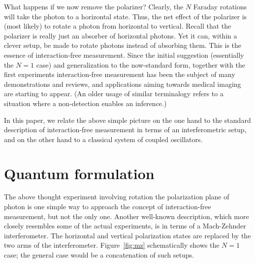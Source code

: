 \documentclass[12pt,aps,prb,preprint]{revtex4}
\begin{document}
What happens if we now remove the polarizer?  Clearly, the $N$ Faraday
rotations will take the photon to a horizontal state.  Thus, the net
effect of the polarizer is (most likely) to rotate a photon from
horizontal to vertical.  Recall that the polarizer is really just an
absorber of horizontal photons.  Yet it can, within a clever setup, be
made to rotate photons instead of absorbing them.  This is the essence
of interaction-free measurement.  Since the initial suggestion
(essentially the $N=1$ case)\cite{1993FoPh...23..987E} and
generalization to the now-standard form, together with the first
experiments\cite{PhysRevLett.74.4763} interaction-free measurement has
been the subject of many
demonstrations\cite{voorthuysen:1504,2006JPhB...39.3177N} and
reviews,\cite{deweerd:272} and applications aiming towards medical
imaging are starting to appear\cite{PhysRevA.80.040902}.  (An older
usage of similar
terminalogy\cite{springerlink:10.1007/BF01327019,dicke:925} refers to
a situation where a non-detection enables an inference.)

In this paper, we relate the above simple picture on the one hand to
the standard description of interaction-free measurement in terms of
an interferometric setup, and on the other hand to a classical system
of coupled oscillators.

\section{Quantum formulation}

The above thought experiment involving rotation the polarization plane
of photon is one simple way to approach the concept of
interaction-free measurement, but not the only one.  Another
well-known description, which more closely resembles some of the
actual experiments, is in terms of a Mach-Zehnder interferometer.  The
horizontal and vertical polarization states are replaced by the two
arms of the interferometer.  Figure~\ref{fig:mz} schematically shows
the $N=1$ case; the general case would be a concatenation of such
setups.
\end{document}
